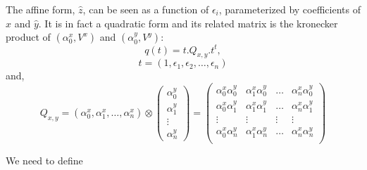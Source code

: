 \documentclass[a4paper,10pt]{article}
\begin{document}
The affine form, $\hat{z}$, can be seen as a function of $\epsilon_i$, parameterized by coefficients of $\hat{x}$ and $\hat{y}$.
It is in fact a quadratic form and its related matrix is the kronecker product of $(\alpha_0^x,V^x)$ and $(\alpha_0^y,V^y)$:
$$
q(t) = t. Q_{x,y}. t^t,
$$
$$
t = (1,\epsilon_1,\epsilon_2,\ldots,\epsilon_n)
$$
and,
$$
Q_{x,y} = (\alpha_0^x,\alpha_1^x,\ldots,\alpha_n^x) \otimes \left( \begin{array}{c} \alpha_0^y \\ \alpha_1^y \\ \vdots \\ \alpha_n^y \end{array} \right) = \left( \begin{array}{cccc}
\alpha_0^x\alpha_0^y & \alpha_1^x\alpha_0^y & \ldots & \alpha_n^x\alpha_0^y \\
\alpha_0^x\alpha_1^y & \alpha_1^x\alpha_1^y & \ldots & \alpha_n^x\alpha_1^y \\
\vdots & \vdots & \vdots & \vdots \\ 
\alpha_0^x\alpha_n^y & \alpha_1^x\alpha_n^y & \ldots & \alpha_n^x\alpha_n^y \\
\end{array} \right)
$$ 

We need to define 
\end{document}
